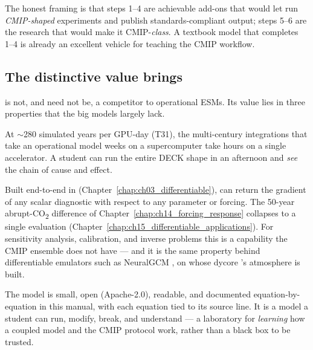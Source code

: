 The honest framing is that steps 1--4 are achievable add-ons that would let
\model{} run \emph{CMIP-shaped} experiments and publish standards-compliant output;
steps 5--6 are the research that would make it CMIP-\emph{class}. A textbook model
that completes 1--4 is already an excellent vehicle for teaching the CMIP workflow.

\subsection{The distinctive value \model{} brings}\label{sec:c20_value}

\model{} is not, and need not be, a competitor to operational ESMs. Its value lies
in three properties that the big models largely lack.

\begin{description}[leftmargin=1.5em,style=nextline]
\item[Speed.] At $\sim$280 simulated years per GPU-day (T31), the multi-century
  integrations that take an operational model weeks on a supercomputer take \model{}
  hours on a single accelerator. A student can run the entire DECK shape in an
  afternoon and \emph{see} the chain of cause and effect.
\item[Differentiability.] Built end-to-end in \jax{}
  (Chapter~\ref{chap:ch03_differentiable}), \model{} can return the gradient of any
  scalar diagnostic with respect to any parameter or forcing. The 50-year
  abrupt-CO\textsubscript{2} difference of Chapter~\ref{chap:ch14_forcing_response}
  collapses to a single  evaluation
  (Chapter~\ref{chap:ch15_differentiable_applications}). For sensitivity analysis,
  calibration, and inverse problems this is a capability the CMIP ensemble does not
  have --- and it is the same property behind differentiable emulators such as
  NeuralGCM \citep{kochkov2024neuralgcm}, on whose \dino{} dycore \model{}'s
  atmosphere is built.
\item[Classroom accessibility.] The model is small, open (Apache-2.0), readable,
  and documented equation-by-equation in this manual, with each equation tied to its
  source line. It is a model a student can run, modify, break, and understand --- a
  laboratory for \emph{learning} how a coupled model and the CMIP protocol work,
  rather than a black box to be trusted.
\end{description}

